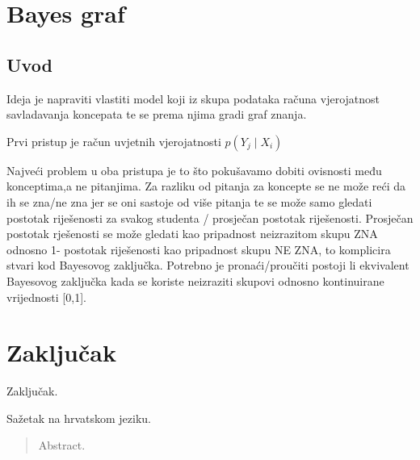 \documentclass[times, utf8,projekt]{fer}
\begin{document}
\chapter{Bayes graf}
	\section{Uvod}
	
	Ideja je napraviti vlastiti model koji iz skupa podataka računa vjerojatnost savladavanja koncepata te se prema njima gradi graf znanja.
	
	Prvi pristup je račun uvjetnih vjerojatnosti $p(Y_j\mid X_i)$
	
	Najveći problem u oba pristupa je to što pokušavamo dobiti ovisnosti među konceptima,a ne pitanjima. Za razliku od pitanja za koncepte se ne može reći da ih se zna/ne zna jer se oni sastoje od više pitanja te se može samo gledati postotak riješenosti za svakog studenta / prosječan postotak riješenosti. Prosječan postotak rješenosti se može gledati kao pripadnost neizrazitom skupu ZNA odnosno 1- postotak riješenosti kao pripadnost skupu NE ZNA, to komplicira stvari kod Bayesovog zaključka. Potrebno je pronaći/proučiti postoji li ekvivalent Bayesovog zaključka kada se koriste neizraziti skupovi odnosno kontinuirane vrijednosti [0,1].
\chapter{Zaključak}
Zaključak.




\begin{sazetak}
Sažetak na hrvatskom jeziku.

\end{sazetak}

\begin{abstract}
Abstract.

\end{abstract}
\end{document}
